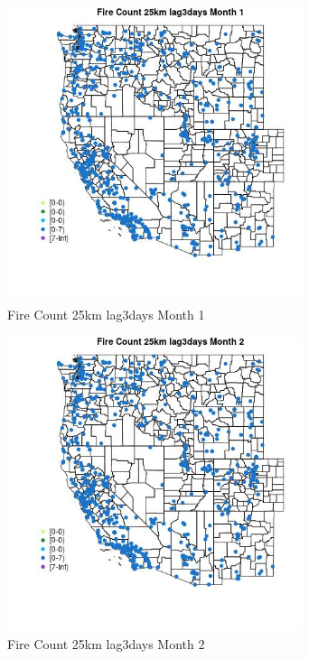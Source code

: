 \begin{figure} 
\centering  
\includegraphics[width=0.77\textwidth]{Code_Outputs/Report_ML_input_PM25_Step4_part_e_de_duplicated_aves_compiled_2019-05-21wNAs_MapObsMo1Fire_Count_25km_lag3days.jpg} 
\caption{\label{fig:Report_ML_input_PM25_Step4_part_e_de_duplicated_aves_compiled_2019-05-21wNAsMapObsMo1Fire_Count_25km_lag3days}Fire Count 25km lag3days Month 1} 
\end{figure} 
 

\begin{figure} 
\centering  
\includegraphics[width=0.77\textwidth]{Code_Outputs/Report_ML_input_PM25_Step4_part_e_de_duplicated_aves_compiled_2019-05-21wNAs_MapObsMo2Fire_Count_25km_lag3days.jpg} 
\caption{\label{fig:Report_ML_input_PM25_Step4_part_e_de_duplicated_aves_compiled_2019-05-21wNAsMapObsMo2Fire_Count_25km_lag3days}Fire Count 25km lag3days Month 2} 
\end{figure} 
 

